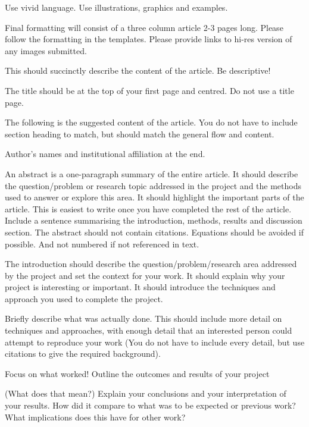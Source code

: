 \documentclass[a4paper, twoside]{article}
\begin{document}
\begin{multicols}{3}
\noindent Use vivid language. Use illustrations, graphics and examples.

%
Final formatting will consist of a three column article 2-3 pages long. Please follow the formatting in the templates. Please provide links to hi-res version of any images submitted.

%
This should succinctly describe the content of the article. Be descriptive!
%

The title should be at the top of your first page and centred.
Do not use a title page.

%
The following is the suggested content of the article. You do not have to include section heading to match, but should match the general flow and content.

Author's names and institutional affiliation at the end.

  An abstract is a one-paragraph summary of the entire article. It should describe the question/problem or research topic addressed in the project and the methods used to answer or explore this area. It should highlight the important parts of the article. This is easiest to write once you have completed the rest of the article. Include a sentence summarising the introduction, methods, results and discussion section. The abstract should not contain citations. Equations should be avoided if possible. And not numbered if not referenced in text. 

%
The introduction should describe the question/problem/research area addressed by the project and set the context for your work. It should explain why your project is interesting or important. It should introduce the techniques and approach you used to complete the project.

%
Briefly describe what was actually done. This should include more detail on techniques and approaches, with enough detail that an interested person could attempt to reproduce your work (You do not have to include every detail, but use citations to give the required background). 

%
Focus on what worked! Outline the outcomes and results of your project

(What does that mean?) Explain your conclusions and your interpretation of your results. How did it compare to what was to be expected or previous work? What implications does this have for other work?


\end{multicols}
\end{document}
